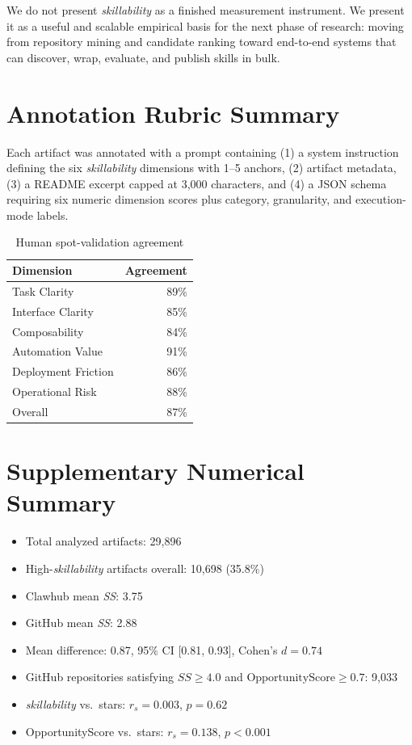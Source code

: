 \documentclass[sigconf,review,anonymous,nonacm]{acmart}
\newcommand{\skillability}{\textit{skillability}\xspace}
\newcommand{\sscore}{\textit{SS}\xspace}
\begin{document}
We do not present \skillability as a finished measurement instrument. We present it as a useful and scalable empirical basis for the next phase of research: moving from repository mining and candidate ranking toward end-to-end systems that can discover, wrap, evaluate, and publish skills in bulk.

\appendix

\section{Annotation Rubric Summary}

Each artifact was annotated with a prompt containing (1) a system instruction defining the six \skillability dimensions with 1--5 anchors, (2) artifact metadata, (3) a README excerpt capped at 3,000 characters, and (4) a JSON schema requiring six numeric dimension scores plus category, granularity, and execution-mode labels.

\begin{table}[h]
\caption{Human spot-validation agreement}
\centering
\begin{tabular}{lr}
\toprule
Dimension & Agreement \\
\midrule
Task Clarity & 89\% \\
Interface Clarity & 85\% \\
Composability & 84\% \\
Automation Value & 91\% \\
Deployment Friction & 86\% \\
Operational Risk & 88\% \\
Overall & 87\% \\
\bottomrule
\end{tabular}
\end{table}

\section{Supplementary Numerical Summary}

\begin{itemize}[leftmargin=*]
    \item Total analyzed artifacts: 29,896
    \item High-\skillability artifacts overall: 10,698 (35.8\%)
    \item Clawhub mean \sscore: 3.75
    \item GitHub mean \sscore: 2.88
    \item Mean difference: 0.87, 95\% CI [0.81, 0.93], Cohen's $d = 0.74$
    \item GitHub repositories satisfying \(\sscore \ge 4.0\) and \(\mathrm{OpportunityScore} \ge 0.7\): 9,033
    \item \skillability vs.\ stars: \(r_s = 0.003\), \(p = 0.62\)
    \item OpportunityScore vs.\ stars: \(r_s = 0.138\), \(p < 0.001\)
\end{itemize}
\end{document}
